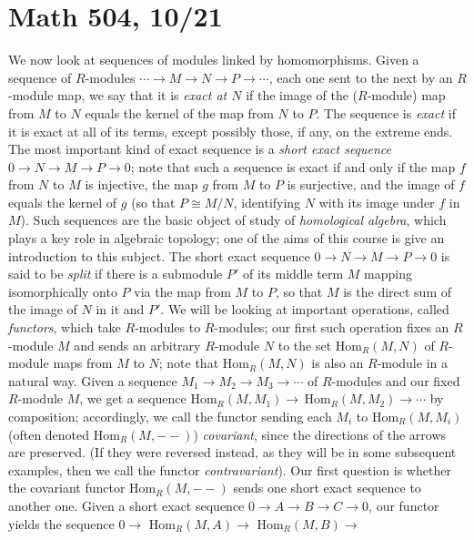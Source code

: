 \documentclass[10pt]{article}
\begin{document}
\section*{Math 504, 10/21}

We now look at sequences of modules linked by homomorphisms. Given a
sequence of $R$-modules $\cdots\rightarrow M\rightarrow N\rightarrow
P\rightarrow\cdots$, each one sent to the next by an $R$-module map, we
say that it is {\sl exact at $N$} if the image of the ($R$-module) map
from $M$ to $N$ equals the kernel of the map from $N$ to $P$. The
sequence is {\sl exact} if it is exact at all of its terms, except
possibly those, if any, on the extreme ends. The most important kind of
exact sequence is a {\sl short exact sequence} $0\rightarrow
N\rightarrow M\rightarrow P\rightarrow 0$; note that such a sequence is
exact if and only if the map $f$ from $N$ to $M$ is injective, the map
$g$ from $M$ to $P$ is surjective, and the image of $f$ equals the
kernel of $g$ (so that $P\cong M/N$, identifying $N$ with its image
under $f$ in $M$). Such sequences are the basic object of study of {\sl
  homological algebra}, which plays a key role in algebraic topology;
one of the aims of this course is give an introduction to this subject.
The short exact sequence $0\rightarrow N\rightarrow M\rightarrow
P\rightarrow 0$ is said to be {\sl split} if there is a submodule $P'$
of its middle term $M$ mapping isomorphically onto $P$ via the map from
$M$ to $P$, so that $M$ is the direct sum of the image of $N$ in it and
$P'$. We will be looking at important operations, called {\sl functors},
which take $R$-modules to $R$-modules; our first such operation fixes an
$R$-module $M$ and sends an arbitrary $R$-module $N$ to the set
Hom$_R(M,N)$ of $R$-module maps from $M$ to $N$; note that Hom$_R(M,N)$
is also an $R$-module in a natural way. Given a sequence $M_1\rightarrow
M_2\rightarrow M_3\rightarrow\cdots$ of $R$-modules and our fixed
$R$-module $M$, we get a sequence
Hom$_R(M,M_1)\rightarrow\,$Hom$_R(M,M_2)\rightarrow\cdots$ by
composition; accordingly, we call the functor sending each $M_i$ to
Hom$_R(M,M_i)$ (often denoted Hom$_R(M,--)$) {\sl covariant}, since the
directions of the arrows are preserved. (If they were reversed instead,
as they will be in some subsequent examples, then we call the functor
{\sl contravariant}). Our first question is whether the covariant
functor Hom$_R(M,--)$ sends one short exact sequence to another one.
Given a short exact sequence $0\rightarrow A\rightarrow B\rightarrow
C\rightarrow 0$, our functor yields the sequence
$0\rightarrow\,\,$Hom$_R(M,A)\rightarrow\,\,$Hom$_R(M,B)\rightarrow\,\,$
\end{document}
